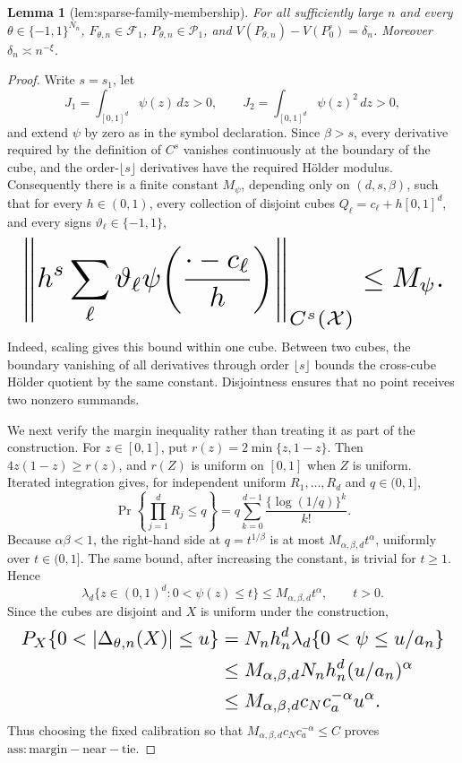 \documentclass{article}
\newtheorem{lemma}{Lemma}
\begin{document}
\begin{lemma}[lem:sparse-family-membership]\label{lem:sparse-family-membership}
For all sufficiently large \(n\) and every \(\theta\in\{-1,1\}^{N_n}\), \(F_{\theta,n}\in\mathcal F_1\), \(P_{\theta,n}\in\mathcal P_1\), and \(V(P_{\theta,n})-V(P_0^\circ)=\delta_n\).  Moreover \(\delta_n\asymp n^{-\xi}\).
\end{lemma}
\begin{proof}
Write \(s=s_1\), let
\[
 J_1=\int_{[0,1]^d}\psi(z)\,dz>0,
 \qquad
 J_2=\int_{[0,1]^d}\psi(z)^2\,dz>0,
\]
and extend \(\psi\) by zero as in the symbol declaration.  Since \(\beta>s\), every derivative required by the definition of \(C^s\) vanishes continuously at the boundary of the cube, and the order-\(\lfloor s\rfloor\) derivatives have the required Hölder modulus.  Consequently there is a finite constant \(M_\psi\), depending only on \((d,s,\beta)\), such that for every \(h\in(0,1)\), every collection of disjoint cubes \(Q_\ell=c_\ell+h[0,1]^d\), and every signs \(\vartheta_\ell\in\{-1,1\}\),
\[
\makebox[\linewidth][c]{\resizebox{0.98\linewidth}{!}{\(\displaystyle \left\|h^s\sum_\ell \vartheta_\ell
 \psi\!\left(\frac{\cdot-c_\ell}{h}\right)\right\|_{C^s(\mathcal X)}
 \le M_\psi.\)}}
\]
Indeed, scaling gives this bound within one cube.  Between two cubes, the boundary vanishing of all derivatives through order \(\lfloor s\rfloor\) bounds the cross-cube Hölder quotient by the same constant.  Disjointness ensures that no point receives two nonzero summands.

We next verify the margin inequality rather than treating it as part of the construction.  For \(z\in[0,1]\), put \(r(z)=2\min\{z,1-z\}\).  Then \(4z(1-z)\ge r(z)\), and \(r(Z)\) is uniform on \([0,1]\) when \(Z\) is uniform.  Iterated integration gives, for independent uniform \(R_1,\ldots,R_d\) and \(q\in(0,1]\),
\[
 \Pr\!\left\{\prod_{j=1}^dR_j\le q\right\}
 =q\sum_{k=0}^{d-1}\frac{\{\log(1/q)\}^k}{k!}.
\]
Because \(\alpha\beta<1\), the right-hand side at \(q=t^{1/\beta}\) is at most \(M_{\alpha,\beta,d}t^\alpha\), uniformly over \(t\in(0,1]\).  The same bound, after increasing the constant, is trivial for \(t\ge1\).  Hence
\[
 \lambda_d\{z\in(0,1)^d:0<\psi(z)\le t\}
 \le M_{\alpha,\beta,d}t^\alpha,
 \qquad t>0.
\]
Since the cubes are disjoint and \(X\) is uniform under the construction,
\[
\makebox[\linewidth][c]{\resizebox{0.98\linewidth}{!}{\(\displaystyle \begin{aligned}
 P_X\{0<|\Delta_{\theta,n}(X)|\le u\}
 &=N_nh_n^d\lambda_d\{0<\psi\le u/a_n\}\\
 &\le M_{\alpha,\beta,d}N_nh_n^d(u/a_n)^\alpha\\
 &\le M_{\alpha,\beta,d}c_Nc_a^{-\alpha}u^\alpha.
 \end{aligned}\)}}
\]
Thus choosing the fixed calibration so that \(M_{\alpha,\beta,d}c_Nc_a^{-\alpha}\le C\) proves \(\mathrm{ass:margin-near-tie}\).


\end{proof}
\end{document}

